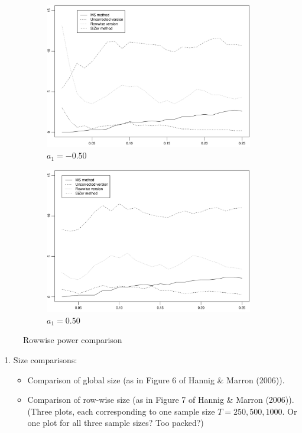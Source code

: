 \begin{enumerate}[label=(\arabic*),leftmargin=0.7cm]
\begin{figure}[t]
\begin{subfigure}{.5\textwidth}
\centering
\includegraphics[width=.9\linewidth]{Plots/pcp_rowwise_T_500_a1_-50.pdf}
\caption{$a_1 = -0.50$}
\end{subfigure}
\begin{subfigure}{.5\textwidth}
\centering
\includegraphics[width=.9\linewidth]{Plots/pcp_rowwise_T_500_a1_50.pdf}
\caption{$a_1 = 0.50$}
\end{subfigure}
\caption{Rowwise power comparison}  
\label{fig:comparison_rowwise_size}
\end{figure}

\begin{enumerate}[label=(\alph*),leftmargin=0.7cm]

\item Size comparisons:
\begin{itemize}[label=--,leftmargin=0.5cm]
\item Comparison of global size (as in Figure 6 of Hannig \& Marron (2006)).
\item Comparison of row-wise size (as in Figure 7 of Hannig \& Marron (2006)). (Three plots, each corresponding to one sample size $T=250, 500, 1000$. Or one plot for all three sample sizes? Too packed?)  
\end{itemize}


\end{enumerate}
\end{enumerate}
